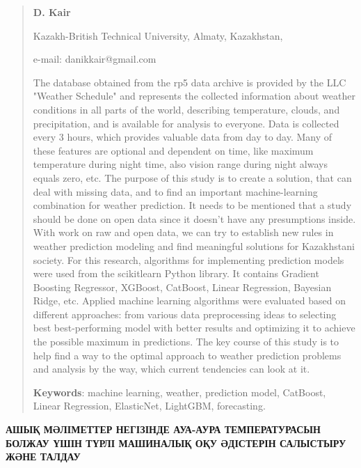\begin{quote}
\textbf{D. Kair}

Kazakh-British Technical University, Almaty, Kazakhstan,

e-mail: danikkair@gmail.com

The database obtained from the rp5 data archive is provided by the LLC
"Weather Schedule" and represents the collected information about
weather conditions in all parts of the world, describing temperature,
clouds, and precipitation, and is available for analysis to everyone.
Data is collected every 3 hours, which provides valuable data from day
to day. Many of these features are optional and dependent on time, like
maximum temperature during night time, also vision range during night
always equals zero, etc. The purpose of this study is to create a
solution, that can deal with missing data, and to find an important
machine-learning combination for weather prediction. It needs to be
mentioned that a study should be done on open data since it doesn't have
any presumptions inside. With work on raw and open data, we can try to
establish new rules in weather prediction modeling and find meaningful
solutions for Kazakhstani society. For this research, algorithms for
implementing prediction models were used from the scikitlearn Python
library. It contains Gradient Boosting Regressor, XGBoost, CatBoost,
Linear Regression, Bayesian Ridge, etc. Applied machine learning
algorithms were evaluated based on different approaches: from various
data preprocessing ideas to selecting best best-performing model with
better results and optimizing it to achieve the possible maximum in
predictions. The key course of this study is to help find a way to the
optimal approach to weather prediction problems and analysis by the way,
which current tendencies can look at it.

\textbf{Keywords}: machine learning, weather, prediction model,
CatBoost, Linear Regression, ElasticNet, LightGBM, forecasting.
\end{quote}

\textbf{АШЫҚ МӘЛІМЕТТЕР НЕГІЗІНДЕ АУА-АУРА ТЕМПЕРАТУРАСЫН БОЛЖАУ ҮШІН
ТҮРЛІ МАШИНАЛЫҚ ОҚУ ӘДІСТЕРІН САЛЫСТЫРУ ЖӘНЕ ТАЛДАУ}

